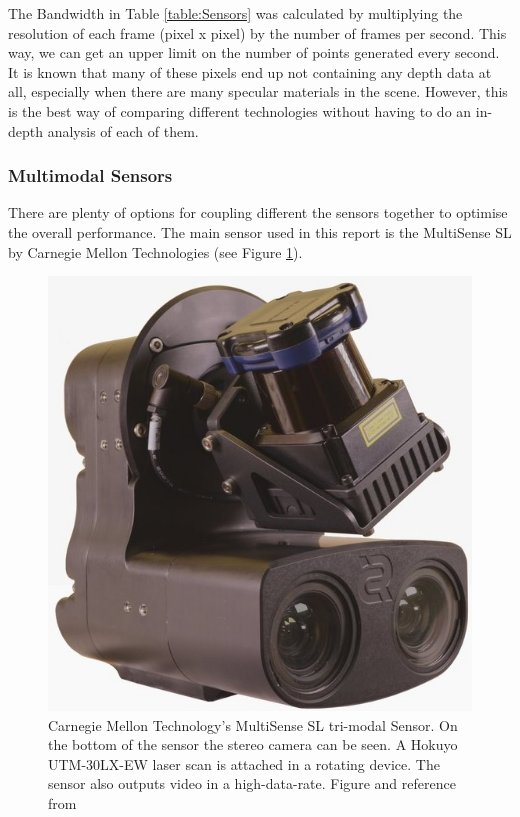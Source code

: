 \documentclass[11pt]{article}
\begin{document}
The Bandwidth in Table \ref{table:Sensors} was calculated by multiplying the resolution of each frame (pixel x pixel) by the number of frames per second. This way, we can get an upper limit on the number of points generated every second. It is known that many of these pixels end up not containing any depth data at all, especially when there are many specular materials in the scene. However, this is the best way of comparing different technologies without having to do an in-depth analysis of each of them.

	\subsubsection{Multimodal Sensors}
	
There are plenty of options for coupling different the sensors together to optimise the overall performance. The main sensor used in this report is the MultiSense SL by Carnegie Mellon Technologies \cite{multisense} (see Figure \ref{fig:MultiSenseSLSensor}).

\begin{figure}
	\begin{minipage}{0.45\textwidth}
		\centering
		\includegraphics[width=\textwidth]{MultiSenseSL}
	\end{minipage} \hfill
	\begin{minipage}{0.55\textwidth}
		\centering
		\caption{Carnegie Mellon Technology's MultiSense SL tri-modal Sensor. On the bottom of the sensor the stereo camera can be seen. A Hokuyo UTM-30LX-EW laser scan is attached in a rotating device. The sensor also outputs video in a high-data-rate. Figure and reference from \cite{MultiSenseSLSensor}}
		\label{fig:MultiSenseSLSensor}
	\end{minipage}				
\end{figure}
\end{document}
